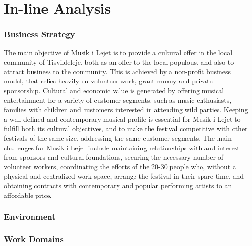 \part{In-line Analysis}


\section{Business Strategy}
The main objective of Musik i Lejet is to provide a cultural offer in the local community of Tisvildeleje, both as an offer to the local populous, and also to attract business to the community. This is achieved by a non-profit business model, that relies heavily on volunteer work, grant money and private sponsorship. Cultural and economic value is generated by offering musical entertainment for a variety of customer segments, such as music enthusiasts, families with children and customers interested in attending wild parties. Keeping a well defined and contemporary musical profile is essential for Musik i Lejet to fulfill both its cultural objectives, and to make the festival competitive with other festivals of the same size, addressing the same customer segments. The main challenges for Musik i Lejet include maintaining relationships with and interest from sponsors and cultural foundations, securing the necessary number of volunteer workers, coordinating the efforts of the 20-30 people who, without a physical and centralized work space, arrange the festival in their spare time, and obtaining contracts with contemporary and popular performing artists to an affordable price.

\section{Environment}

\section{Work Domains}


